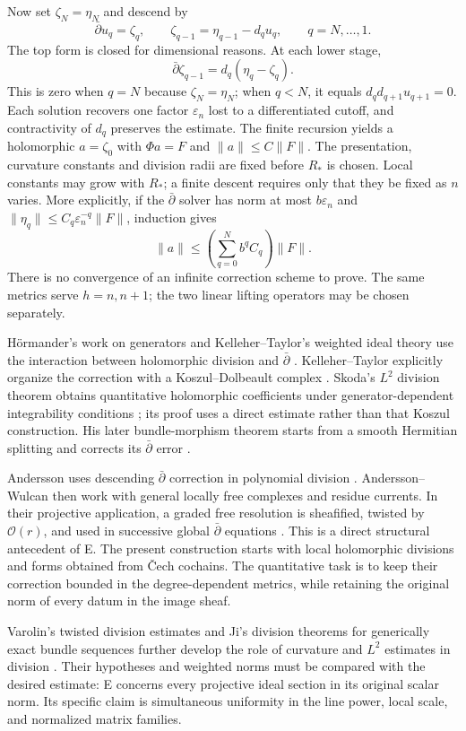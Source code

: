 \documentclass[11pt,reqno]{amsart}
\theoremstyle{remark}
\newcommand{\cO}{\mathcal O}
\newcommand{\eps}{\varepsilon}
\newcommand{\dbar}{\bar\partial}
\begin{document}
Now set $\zeta_N=\eta_N$ and descend by
\[
 \dbar u_q=\zeta_q,\qquad
 \zeta_{q-1}=\eta_{q-1}-d_qu_q,
 \qquad q=N,\ldots,1.
\]
The top form is closed for dimensional reasons. At each lower stage,
\[
\dbar\zeta_{q-1}
 =d_q(\eta_q-\zeta_q).
\]
This is zero when $q=N$ because $\zeta_N=\eta_N$; when $q<N$,
it equals $d_qd_{q+1}u_{q+1}=0$. Each solution
recovers one factor $\eps_n$ lost to a differentiated cutoff, and
contractivity of $d_q$ preserves the estimate. The finite recursion
yields a holomorphic $a=\zeta_0$ with $\Phi a=F$ and
$\|a\|\le C\|F\|$. The presentation, curvature constants and
division radii are fixed before $R_*$ is chosen. Local constants may
grow with $R_*$; a finite descent requires only that they be fixed
as $n$ varies. More explicitly, if the $\dbar$ solver has norm at most
$b\eps_n$ and $\|\eta_q\|\le C_q\eps_n^{-q}\|F\|$, induction gives
\[
\|a\|\le \left(\sum_{q=0}^N b^qC_q\right)\|F\|.
\]
There is no convergence of an infinite correction scheme to prove.
The same metrics serve $h=n,n+1$; the two linear lifting operators
may be chosen separately.

H\"ormander's work on generators and Kelleher--Taylor's weighted
ideal theory use the interaction between holomorphic division and
$\dbar$ \cite{HormanderGenerators,KelleherTaylor}.
Kelleher--Taylor explicitly organize the correction with a
Koszul--Dolbeault complex \cite[Section~II]{KelleherTaylor}.
Skoda's $L^2$ division theorem obtains quantitative holomorphic
coefficients under generator-dependent integrability conditions
\cite{Skoda1972}; its proof uses a direct estimate rather than
that Koszul construction. His later bundle-morphism theorem starts
from a smooth Hermitian splitting and corrects its $\dbar$ error
\cite[Section~2]{Skoda1978}.


Andersson uses descending $\dbar$ correction in polynomial division
\cite[Theorem~2.3 and Example~2.4]{Andersson2006}.
Andersson--Wulcan then work with general locally free complexes and
residue currents. In their projective application, a graded free
resolution is sheafified, twisted by $\cO(r)$, and used in successive
global $\dbar$ equations \cite[Section~6, Proposition~6.1]{AnderssonWulcan}.
This is a direct structural antecedent of E. The present construction
starts with local holomorphic divisions and forms obtained from
\v Cech cochains. The quantitative task is to keep their correction
bounded in the degree-dependent metrics, while retaining the
original norm of every datum in the image sheaf.


Varolin's twisted division estimates and Ji's division theorems for
generically exact bundle sequences further develop the role of
curvature and $L^2$ estimates in division
\cite{Varolin,Ji}. Their hypotheses and weighted norms must be
compared with the desired estimate: E concerns every projective ideal
section in its original scalar norm. Its specific claim is
simultaneous uniformity in the line power, local scale, and
normalized matrix families.
\end{document}
